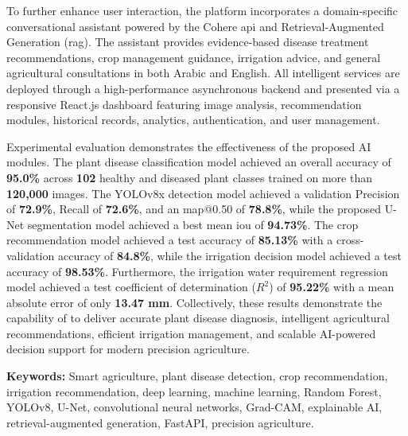 To further enhance user interaction, the platform incorporates a domain-specific conversational assistant powered by the Cohere \gls{api} and Retrieval-Augmented Generation (\gls{rag}). The assistant provides evidence-based disease treatment recommendations, crop management guidance, irrigation advice, and general agricultural consultations in both Arabic and English. All intelligent services are deployed through a high-performance asynchronous \fastapi backend and presented via a responsive React.js dashboard featuring image analysis, recommendation modules, historical records, analytics, authentication, and user management.

Experimental evaluation demonstrates the effectiveness of the proposed AI modules. The plant disease classification model achieved an overall accuracy of \textbf{95.0\%} across \textbf{102} healthy and diseased plant classes trained on more than \textbf{120,000} images. The YOLOv8x detection model achieved a validation Precision of \textbf{72.9\%}, Recall of \textbf{72.6\%}, and an \gls{map}@0.50 of \textbf{78.8\%}, while the proposed U-Net segmentation model achieved a best mean \gls{iou} of \textbf{94.73\%}. The crop recommendation model achieved a test accuracy of \textbf{85.13\%} with a cross-validation accuracy of \textbf{84.8\%}, while the irrigation decision model achieved a test accuracy of \textbf{98.53\%}. Furthermore, the irrigation water requirement regression model achieved a test coefficient of determination (\(R^2\)) of \textbf{95.22\%} with a mean absolute error of only \textbf{13.47 mm}. Collectively, these results demonstrate the capability of \nabta to deliver accurate plant disease diagnosis, intelligent agricultural recommendations, efficient irrigation management, and scalable AI-powered decision support for modern precision agriculture.

\vspace{1em}
\noindent\textbf{Keywords:} Smart agriculture, plant disease detection, crop recommendation, irrigation recommendation, deep learning, machine learning, Random Forest, YOLOv8, U-Net, convolutional neural networks, Grad-CAM, explainable AI, retrieval-augmented generation, FastAPI, precision agriculture.
